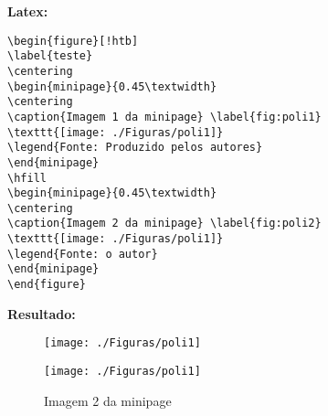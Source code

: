 \begin{apendicesenv}
\textbf{Latex:}
\begin{verbatim}
\begin{figure}[!htb]
\label{teste}
\centering
\begin{minipage}{0.45\textwidth}
\centering
\caption{Imagem 1 da minipage} \label{fig:poli1}
\texttt{[image: ./Figuras/poli1]}
\legend{Fonte: Produzido pelos autores}
\end{minipage}
\hfill
\begin{minipage}{0.45\textwidth}
\centering
\caption{Imagem 2 da minipage} \label{fig:poli2}
\texttt{[image: ./Figuras/poli1]}
\legend{Fonte: o autor}
\end{minipage}
\end{figure}
\end{verbatim}


\textbf{Resultado:}
\begin{figure}[!htb]
	\label{teste}
	\centering
	\begin{minipage}{0.45\textwidth}
		\centering
		\caption{Imagem 1 da minipage} \label{fig:poli1}
		\texttt{[image: ./Figuras/poli1]}
	\end{minipage}
	\hfill
	\begin{minipage}{0.45\textwidth}
		\centering
		\caption{Imagem 2 da minipage} \label{fig:poli2}
		\texttt{[image: ./Figuras/poli1]}
	\end{minipage}
\end{figure}

\end{apendicesenv}